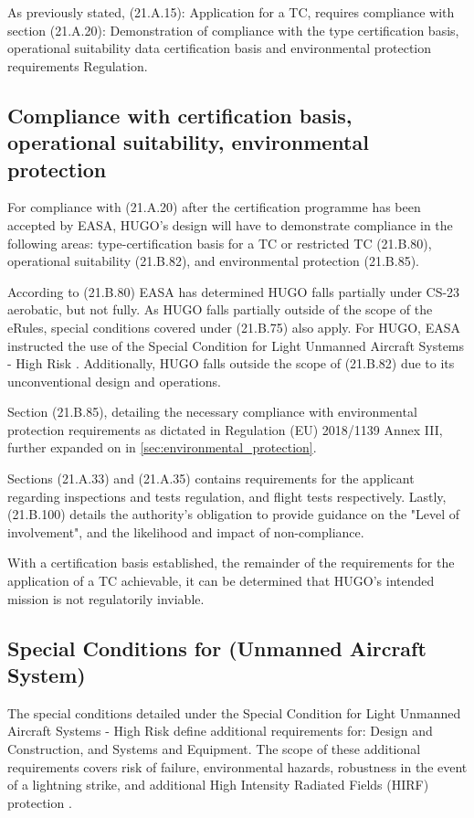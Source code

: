 As previously stated, (21.A.15): Application for a TC, requires compliance with section (21.A.20): Demonstration of compliance with the type certification basis, operational suitability data certification basis and environmental protection requirements Regulation. 

\subsection{Compliance with certification basis, operational suitability, environmental protection}
\label{sec:CS-23 and SC-UAS}

For compliance with (21.A.20) after the certification programme has been accepted by EASA, HUGO's design will have to demonstrate compliance in the following areas: type-certification basis for a TC or restricted TC (21.B.80), operational suitability (21.B.82), and environmental protection (21.B.85).


According to (21.B.80) EASA has determined HUGO falls partially under CS-23 aerobatic, but not fully. As HUGO falls partially outside of the scope of the eRules, special conditions covered under (21.B.75) also apply. For HUGO, EASA instructed the use of the Special Condition for Light Unmanned Aircraft Systems - High Risk \cite{EASA_SC_Light_UAS_High_Risk_2021}. Additionally, HUGO falls outside the scope of (21.B.82) due to its unconventional design and operations. 

Section (21.B.85), detailing the necessary compliance with environmental protection requirements as dictated in Regulation (EU) 2018/1139 Annex III, further expanded on in \autoref{sec:environmental_protection}. 

Sections (21.A.33) and (21.A.35) contains requirements for the applicant regarding inspections and tests regulation, and flight tests respectively. Lastly, (21.B.100) details the authority's obligation to provide guidance on the "Level of involvement", and the likelihood and impact of non-compliance. 

With a certification basis established, the remainder of the requirements for the application of a TC achievable, it can be determined that HUGO's intended mission is not regulatorily inviable.

\subsection{Special Conditions for (Unmanned Aircraft System)}
\label{sec: special conditions}
The special conditions detailed under the Special Condition for Light Unmanned Aircraft Systems - High Risk define additional requirements for: Design and Construction, and Systems and Equipment. The scope of these additional requirements covers risk of failure, environmental hazards, robustness in the event of a lightning strike, and additional High Intensity Radiated Fields (HIRF) protection \cite{EASA_SC_Light_UAS_High_Risk_2021}.

